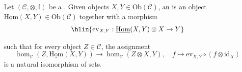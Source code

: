 \begin{definition} \label{definition:internal_hom_object_in_a_category}
Let $(\mathcal{C}, \otimes, \mathbb{I})$ be a . Given objects $X, Y \in \mathrm{Ob}(\mathcal{C})$, an  is an object $\underline{\mathrm{Hom}}(X,Y) \in \mathrm{Ob}(\mathcal{C})$ together with a morphism
$$\hlin{\mathrm{ev}_{X,Y}: \underline{\mathrm{Hom}}(X,Y) \otimes X \to Y}$$

such that for every object $Z \in \mathcal{C}$, the assignment
\[
\hom_{\mathcal{C}}(Z, \underline{\mathrm{Hom}}(X,Y)) \to \hom_{\mathcal{C}}(Z \otimes X, Y), \quad f \mapsto \mathrm{ev}_{X,Y} \circ (f \otimes \mathrm{id}_X)
\]
is a natural isomorphism of sets.
\end{definition}




